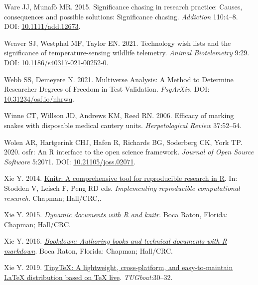 \documentclass[10pt,a4paper]{article}
\newlength{\cslhangindent}
\newlength{\cslentryspacingunit} %
\newenvironment{CSLReferences}[2] %
 {%
  \setlength{\parindent}{0pt}
  \ifodd #1
  \let\oldpar\par
  \def\par{\hangindent=\cslhangindent\oldpar}
  \fi
  \setlength{\parskip}{#2\cslentryspacingunit}
 }%
 {}
\begin{document}
\begin{CSLReferences}{1}{0}
\leavevmode{}%
Ware JJ, Munafò MR. 2015. Significance chasing in research practice: Causes, consequences and possible solutions: {Significance} chasing. \emph{Addiction} 110:4--8. DOI: \href{https://doi.org/10.1111/add.12673}{10.1111/add.12673}.

\leavevmode{}%
Weaver SJ, Westphal MF, Taylor EN. 2021. Technology wish lists and the significance of temperature-sensing wildlife telemetry. \emph{Animal Biotelemetry} 9:29. DOI: \href{https://doi.org/10.1186/s40317-021-00252-0}{10.1186/s40317-021-00252-0}.

\leavevmode{}%
Webb SS, Demeyere N. 2021. Multiverse {Analysis}: {A} {Method} to {Determine} {Researcher} {Degrees} of {Freedom} in {Test} {Validation}. \emph{PsyArXiv}. DOI: \href{https://doi.org/10.31234/osf.io/nhrwq}{10.31234/osf.io/nhrwq}.

\leavevmode{}%
Winne CT, Willson JD, Andrews KM, Reed RN. 2006. Efficacy of marking snakes with disposable medical cautery units. \emph{Herpetological Review} 37:52--54.

\leavevmode{}%
Wolen AR, Hartgerink CHJ, Hafen R, Richards BG, Soderberg CK, York TP. 2020. {osfr}: An {R} interface to the open science framework. \emph{Journal of Open Source Software} 5:2071. DOI: \href{https://doi.org/10.21105/joss.02071}{10.21105/joss.02071}.

\leavevmode{}%
Xie Y. 2014. \href{http://www.crcpress.com/product/isbn/9781466561595}{Knitr: A comprehensive tool for reproducible research in {R}}. In: Stodden V, Leisch F, Peng RD eds. \emph{Implementing reproducible computational research}. Chapman; Hall/CRC,.

\leavevmode{}%
Xie Y. 2015. \emph{\href{https://yihui.org/knitr/}{Dynamic documents with {R} and knitr}}. Boca Raton, Florida: Chapman; Hall/CRC.

\leavevmode{}%
Xie Y. 2016. \emph{\href{https://bookdown.org/yihui/bookdown}{Bookdown: Authoring books and technical documents with {R} markdown}}. Boca Raton, Florida: Chapman; Hall/CRC.

\leavevmode{}%
Xie Y. 2019. \href{https://tug.org/TUGboat/Contents/contents40-1.html}{TinyTeX: A lightweight, cross-platform, and easy-to-maintain LaTeX distribution based on TeX live}. \emph{TUGboat}:30--32.


\end{CSLReferences}
\end{document}
